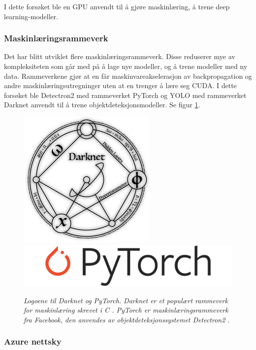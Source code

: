 I dette forsøket ble en GPU anvendt til å gjøre maskinlæring, å trene deep learning-modeller.

\subsubsection{Maskinlæringsrammeverk}

Det har blitt utviklet flere maskinlæringsrammeverk. Disse reduserer mye av kompleksiteten som går med på å lage nye modeller, og å trene modeller med ny data. Rammeverkene gjør at en får maskinvareakselerasjon av backpropagation og andre maskinlæringsutregninger uten at en trenger å lære seg CUDA. I dette forsøket ble Detectron2 med rammeverket PyTorch og YOLO med rammeverket Darknet anvendt til å trene objektdeteksjonsmodeller. Se figur \ref{fig:dl_libs}.

\begin{figure}[t]
\begin{center} 
\includegraphics[scale=0.30]{figures/darknet-logo}
\includegraphics[scale=0.30]{figures/Pytorch_logo}
\caption{\small \sl Logoene til Darknet og PyTorch. Darknet er et populært rammeverk for maskinlæring skrevet i C \cite{Redmon 2016}. PyTorch er maskinlæringsrammeverk fra Facebook, den anvendes av objektdeteksjonssystemet Detectron2 \cite{Wu m.fl. 2020}. \label{fig:dl_libs}}
\end{center} 
\end{figure} 

\subsubsection{Azure nettsky}

